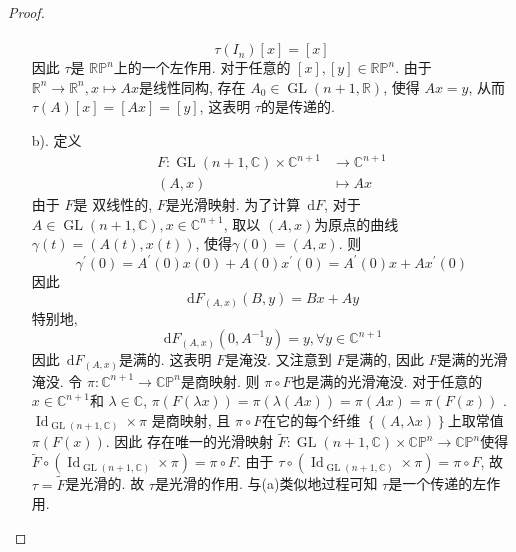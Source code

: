 \documentclass[../main.tex]{subfiles}
\begin{document}
\begin{proof}
\begin{enumerate}
\[\begin{aligned}
        \end{aligned}
        \] \[
        \tau \left( I_{n} \right)[x]= [x] 
        \]因此 \(  \tau   \)是 \(  \mathbb{RP}^{n}  \)上的一个左作用.  对于任意的 \(  [x]  , [y]\in \mathbb{RP}^{n}\). 由于 \(  \mathbb{R} ^{n}\to \mathbb{R} ^{n}, x\mapsto  Ax  \)是线性同构, 存在 \(  A_0\in  \operatorname{GL} \left( n+ 1,\mathbb{R}  \right)   \), 使得 \(  Ax= y  \), 从而  \(  \tau \left( A \right)[x]= [Ax]= [y]   \), 这表明 \(  \tau   \)的是传递的.
        \item [b).]   定义 \[
        \begin{aligned}
         F: \operatorname{GL} \left( n+ 1, \mathbb{C}  \right)\times \mathbb{C} ^{n+ 1}&\to \mathbb{C} ^{n+ 1} \\ 
          \left( A,x \right)&\mapsto  Ax
        \end{aligned}
        \]由于 \(  F  \)是 双线性的,  \(  F  \)是光滑映射. 为了计算 \(  \,\mathrm{d} F  \), 对于 \(  A\in \operatorname{GL} \left( n+ 1,\mathbb{C}  \right), x\in \mathbb{C} ^{n+ 1}   \), 取以 \(  \left( A, x \right)   \)为原点的曲线 \(   \gamma \left( t \right)= \left( A\left( t \right), x\left( t \right)   \right)    \), 使得\(   \gamma \left( 0 \right)= \left( A,x \right)    \).  则 \[
         \gamma ^{\prime} \left( 0 \right)= A^{\prime} \left( 0 \right)x\left( 0 \right)+ A\left( 0 \right)x^{\prime} \left( 0\right)= A^{\prime} \left( 0 \right)x+ Ax^{\prime} \left( 0 \right)      
        \]    因此 \[
        \,\mathrm{d} F_{\left( A,x \right) }\left( B,y \right)= Bx+ Ay 
        \] 特别地, \[
        \,\mathrm{d} F_{\left( A,x \right) }\left( 0,A^{-1} y \right)= y ,\forall y\in \mathbb{C} ^{n+ 1}
        \] 因此 \(  \,\mathrm{d} F_{\left( A,x \right) }  \)是满的. 这表明 \(  F  \)是淹没.  又注意到 \(  F  \)是满的, 因此 \(  F  \)是满的光滑淹没.  令 \(   \pi : \mathbb{C} ^{n+ 1}\to \mathbb{CP}^{n}  \)是商映射. 则 \(   \pi \circ F  \)也是满的光滑淹没.      对于任意的 \(  x\in \mathbb{C} ^{n+ 1}  \)和 \(   \lambda \in \mathbb{C}   \), \(   \pi \left( F\left(  \lambda x \right)  \right)=  \pi \left(  \lambda \left( Ax \right)  \right)=  \pi \left( Ax \right)=  \pi \left( F\left( x \right)  \right)      \)   .  \(  \operatorname{Id}_{\operatorname{GL} \left( n+ 1,\mathbb{C}  \right) } \times  \pi  \) 是商映射, 且 \(   \pi \circ F  \)在它的每个纤维 \(  \left\{ \left( A, \lambda x \right)  \right\}  \)上取常值 \(   \pi \left( F\left( x \right)  \right)   \). 因此 存在唯一的光滑映射 \(  \tilde{F}: \operatorname{GL} \left( n+ 1,\mathbb{C}  \right)\times \mathbb{CP}^{n}\to \mathbb{CP}^{n}   \)使得 \(  \tilde{F}\circ \left( \operatorname{Id}_{\operatorname{GL} \left( n+ 1 ,\mathbb{C} \right) }\times  \pi  \right)=  \pi \circ F   \). 由于 \(  \tau \circ \left( \operatorname{Id}_{\operatorname{GL} \left( n+ 1,\mathbb{C}  \right) }\times  \pi  \right)=  \pi \circ F   \), 故 \(  \tau  = \tilde{F}\)是光滑的.       故 \(  \tau   \)是光滑的作用. 与(a)类似地过程可知 \(  \tau   \)是一个传递的左作用. 

\end{enumerate}
\end{proof}
\end{document}
